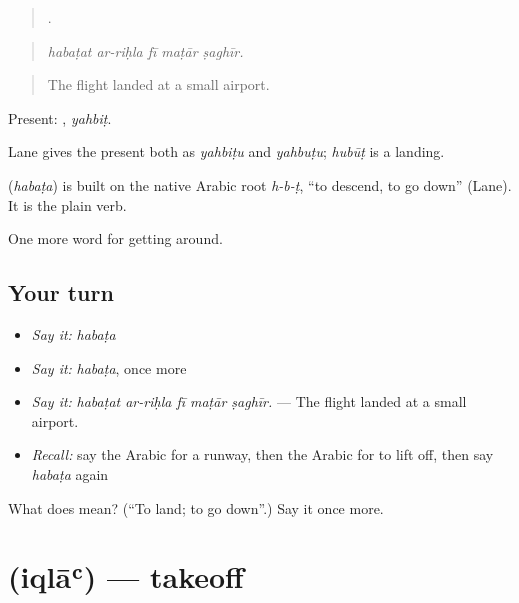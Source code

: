 \begin{quote}
    .
\end{quote}

\begin{quote}
\emph{habaṭat ar-riḥla fī maṭār ṣaghīr.}
\end{quote}

\begin{quote}
The flight landed at a small airport.
\end{quote}

Present: , \emph{yahbiṭ}.

Lane gives the present both as \emph{yahbiṭu} and \emph{yahbuṭu}; \emph{hubūṭ} is a landing.

\begin{cousinweb}
\textbf{} (\emph{habaṭa}) is built on the native Arabic root \emph{h-b-ṭ}, \textquotedblleft{}to descend, to go down\textquotedblright{} (Lane). It is the plain verb.
\end{cousinweb}

\begin{grammarlens}[title={What you've built}]
One more word for getting around.
\end{grammarlens}

\subsection*{Your turn}
\begin{itemize}
\raggedright
  \item \emph{Say it:} \emph{habaṭa}
  \item \emph{Say it:} \emph{habaṭa}, once more
  \item \emph{Say it:} \emph{habaṭat ar-riḥla fī maṭār ṣaghīr.} — The flight landed at a small airport.
  \item \emph{Recall:} say the Arabic for a runway, then the Arabic for to lift off, then say \emph{habaṭa} again
\end{itemize}

\begin{tcolorbox}[breakable,colback=teal!4,colframe=teal!35!black,title={Before you move on}]
What does  mean? (\textquotedblleft{}To land; to go down\textquotedblright{}.) Say it once more.
\end{tcolorbox}
\section[\texorpdfstring{\ar{إقلاع} (iqlāʿ)}{إقلاع (iqlāʿ)}]{ (iqlāʿ) — takeoff}

